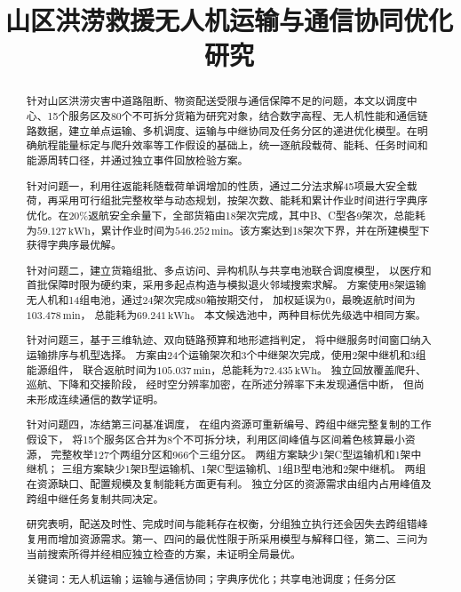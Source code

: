 \documentclass[bwprint]{gmcmthesis}
\title{山区洪涝救援无人机运输与通信协同优化研究}
\begin{document}
\maketitle

\begin{abstract}
针对山区洪涝灾害中道路阻断、物资配送受限与通信保障不足的问题，本文以调度中心、15个服务区及80个不可拆分货箱为研究对象，结合数字高程、无人机性能和通信链路数据，建立单点运输、多机调度、运输与中继协同及任务分区的递进优化模型。在明确航程能量标定与爬升效率等工作假设的基础上，统一逐航段载荷、能耗、任务时间和能源周转口径，并通过独立事件回放检验方案。

针对问题一，利用往返能耗随载荷单调增加的性质，通过二分法求解45项最大安全载荷，再采用可行组批完整枚举与动态规划，按架次数、能耗和累计作业时间进行字典序优化。在$20\%$返航安全余量下，全部货箱由18架次完成，其中B、C型各9架次，总能耗为$59.127\,\mathrm{kWh}$，累计作业时间为$546.252\,\mathrm{min}$。该方案达到18架次下界，并在所建模型下获得字典序最优解。

针对问题二，建立货箱组批、多点访问、异构机队与共享电池联合调度模型，
以医疗和首批保障时限为硬约束，采用多起点构造与模拟退火邻域搜索求解。
方案使用8架运输无人机和14组电池，通过24架次完成80箱按期交付，
加权延误为0，最晚返航时间为$103.478\,\mathrm{min}$，
总能耗为$69.241\,\mathrm{kWh}$。
本文候选池中，两种目标优先级选中相同方案。

针对问题三，基于三维轨迹、双向链路预算和地形遮挡判定，
将中继服务时间窗口纳入运输排序与机型选择。
方案由24个运输架次和3个中继架次完成，使用2架中继机和3组能源组件，
联合返航时间为$105.037\,\mathrm{min}$，总能耗为$72.435\,\mathrm{kWh}$。
独立回放覆盖爬升、巡航、下降和交接阶段，
经时空分辨率加密，在所述分辨率下未发现通信中断，
但尚未形成连续通信的数学证明。

针对问题四，冻结第三问基准调度，
在组内资源可重新编号、跨组中继完整复制的工作假设下，
将15个服务区合并为8个不可拆分块，利用区间峰值与区间着色核算最小资源，
完整枚举127个两组分区和966个三组分区。
两组方案缺少1架C型运输机和1架中继机；
三组方案缺少1架B型运输机、1架C型运输机、1组B型电池和2架中继机。
两组在资源缺口、配置规模及复制能耗方面更有利。
独立分区的资源需求由组内占用峰值及跨组中继任务复制共同决定。

研究表明，配送及时性、完成时间与能耗存在权衡，分组独立执行还会因失去跨组错峰复用而增加资源需求。第一、四问的最优性限于所采用模型与解释口径，第二、三问为当前搜索所得并经相应独立检查的方案，未证明全局最优。

\par\vspace{\baselineskip}
\noindent
{\lishu{} 关键词}：无人机运输；运输与通信协同；字典序优化；共享电池调度；任务分区
\end{abstract}
\end{document}
